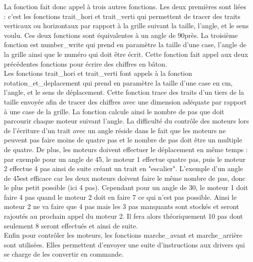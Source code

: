 \documentclass[12pt]{article}
\begin{document}
La fonction fait donc appel à trois autres fonctions. Les deux premières sont liées : c'est les fonctions trait\_hori et trait\_verti qui permettent de tracer des traits verticaux ou horizontaux par rapport à la grille suivant la taille, l'angle, et le sens voulu. Ces deux fonctions sont équivalentes à un angle de 90\degree près. La troisième fonction est number\_write qui prend en paramètre la taille d'une case, l'angle de la grille ainsi que le numéro qui doit être écrit. Cette fonction fait appel aux deux précédentes fonctions pour écrire des chiffres en bâton.\\

\noindent
Les fonctions trait\_hori et trait\_verti font appels à la fonction rotation\_et\_deplacement qui prend en paramètre la taille d'une case en cm, l'angle, et le sens de déplacement. Cette fonction trace des traits d'un tiers de la taille envoyée afin de tracer des chiffres avec une dimension adéquate par rapport à une case de la grille. La fonction calcule ainsi le nombre de pas que doit parcourir chaque moteur suivant l'angle. La difficulté du contrôle des moteurs lors de l'écriture d'un trait avec un angle réside dans le fait que les moteurs ne peuvent pas faire moins de quatre pas et le nombre de pas doit être un multiple de quatre. De plus, les moteurs doivent effectuer le déplacement en même temps : par exemple pour un angle de 45\degree, le moteur 1 effectue quatre pas, puis le moteur 2 effectue 4 pas ainsi de suite créant un trait en "escalier". L'exemple d'un angle de 45\degree est efficace car les deux moteurs doivent faire le même nombre de pas, donc le plus petit possible (ici 4 pas). Cependant pour un angle de 30\degree, le moteur 1 doit faire 4 pas quand le moteur 2 doit en faire 7 ce qui n'est pas possible. Ainsi le moteur 2 ne va faire que 4 pas mais les 3 pas manquants sont stockés et seront rajoutés au prochain appel du moteur 2. Il fera alors théoriquement 10 pas dont seulement 8 seront effectués et ainsi de suite.\\

\noindent
Enfin pour contrôler les moteurs, les fonctions marche\_avant et marche\_arrière sont utilisées. Elles permettent d'envoyer une suite d'instructions aux drivers qui se charge de les convertir en commande.
\end{document}
